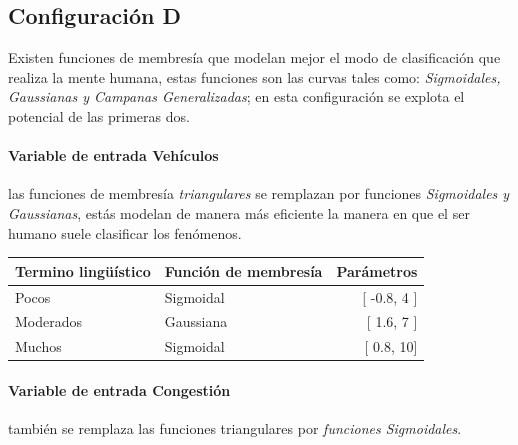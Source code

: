 \subsection{Configuración D}\label{section:configd}
Existen funciones de membresía que modelan mejor el modo de clasificación que realiza la mente humana, estas funciones son las curvas tales como: \textit{Sigmoidales, Gaussianas y Campanas Generalizadas}; en esta configuración se explota el potencial de las primeras dos.

\paragraph{Variable de entrada Vehículos} las funciones de membresía \textit{triangulares} se remplazan por funciones \textit{Sigmoidales y Gaussianas}, estás modelan de manera más eficiente la manera en que el ser humano suele clasificar los fenómenos.
\begin{center}
	\begin{tabular}{llr} \toprule
		Termino lingüístico & Función de membresía & Parámetros \\ \midrule
		Pocos & Sigmoidal & [ -0.8, 4 ] \\
		Moderados & Gaussiana & [ 1.6, 7 ] \\
		Muchos & Sigmoidal & [ 0.8, 10] \\ \bottomrule
	\end{tabular}
\end{center}

\paragraph{Variable de entrada Congestión} también se remplaza las funciones triangulares por \textit{funciones Sigmoidales}.

